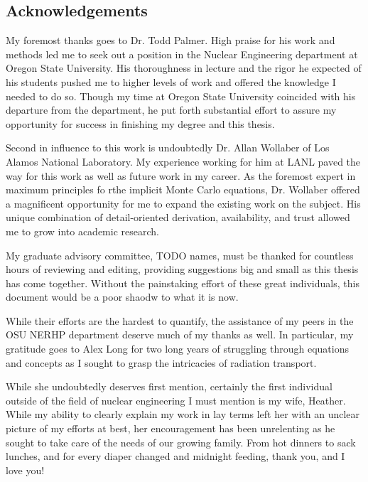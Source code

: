 \begin{center}
\section*{Acknowledgements}
\end{center}

\thispagestyle{empty}

\indent %
My foremost thanks goes to Dr. Todd Palmer.  High praise for his work and methods led me to seek out a position in the Nuclear Engineering department at Oregon State University.  His thoroughness in lecture and the rigor he expected of his students pushed me to higher levels of work and offered the knowledge I needed to do so.  Though my time at Oregon State University coincided with his departure from the department, he put forth substantial effort to assure my opportunity for success in finishing my degree and this thesis.

Second in influence to this work is undoubtedly Dr. Allan Wollaber of Los Alamos National Laboratory.  My experience working for him at LANL paved the way for this work as well as future work in my career.  As the foremost expert in maximum principles fo rthe implicit Monte Carlo equations, Dr. Wollaber offered a magnificent opportunity for me to expand the existing work on the subject.  His unique combination of detail-oriented derivation, availability, and trust allowed me to grow into academic research.

My graduate advisory committee, TODO names, must be thanked for countless hours of reviewing and editing, providing suggestions big and small as this thesis has come together.  Without the painstaking effort of these great individuals, this document would be a poor shaodw to what it is now. 

While their efforts are the hardest to quantify, the assistance of my peers in the OSU NERHP department deserve much of my thanks as well.  In particular, my gratitude goes to Alex Long for two long years of struggling through equations and concepts as I sought to grasp the intricacies of radiation transport.

While she undoubtedly deserves first mention, certainly the first individual outside of the field of nuclear engineering I must mention is my wife, Heather.  While my ability to clearly explain my work in lay terms left her with an unclear picture of my efforts at best, her encouragement has been unrelenting as he sought to take care of the needs of our growing family.  From hot dinners to sack lunches, and for every diaper changed and midnight feeding, thank you, and I love you! 

